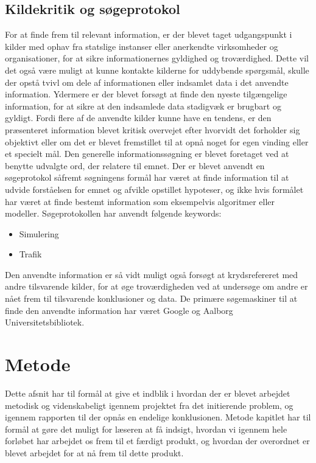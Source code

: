 \section{Kildekritik og søgeprotokol}
For at finde frem til relevant information, er der blevet taget udgangspunkt i kilder med ophav fra statslige instanser eller anerkendte virksomheder og organisationer, for at sikre informationernes gyldighed og troværdighed. Dette vil det også være muligt at kunne kontakte kilderne for uddybende spørgsmål, skulle der opstå tvivl om dele af informationen eller indsamlet data i det anvendte information. Ydermere er der blevet forsøgt at finde den nyeste tilgængelige information, for at sikre at den indsamlede data stadigvæk er brugbart og gyldigt. Fordi flere af de anvendte kilder kunne have en tendens, er den præsenteret information blevet kritisk overvejet efter hvorvidt det forholder sig objektivt eller om det er blevet fremstillet til at opnå noget for egen vinding eller et specielt mål. Den generelle informationssøgning er blevet foretaget ved at benytte udvalgte ord, der relatere til emnet.
Der er blevet anvendt en søgeprotokol såfremt søgningens formål har været at finde information til at udvide forståelsen for emnet og afvikle opstillet hypoteser, og ikke hvis formålet har været at finde bestemt information som eksempelvis algoritmer eller modeller. Søgeprotokollen har anvendt følgende keywords:
\begin{itemize}
\item Simulering
\item Trafik
\end{itemize}
 Den anvendte information er så vidt muligt også forsøgt at krydsrefereret med andre tilsvarende kilder, for at øge troværdigheden ved at undersøge om andre er nået frem til tilsvarende konklusioner og data. De primære søgemaskiner til at finde den anvendte information har været Google og Aalborg Universitetsbibliotek. 


\chapter{Metode}\label{Metode}

Dette afsnit har til formål at give et indblik i hvordan der er blevet arbejdet metodisk og videnskabeligt igennem projektet fra det initierende problem, og igennem rapporten til der opnås en endelige konklusionen. Metode kapitlet har til formål at gøre det muligt for læseren at få indsigt, hvordan vi igennem hele forløbet har arbejdet os frem til et færdigt produkt, og hvordan der overordnet er blevet arbejdet for at nå frem til dette produkt.

